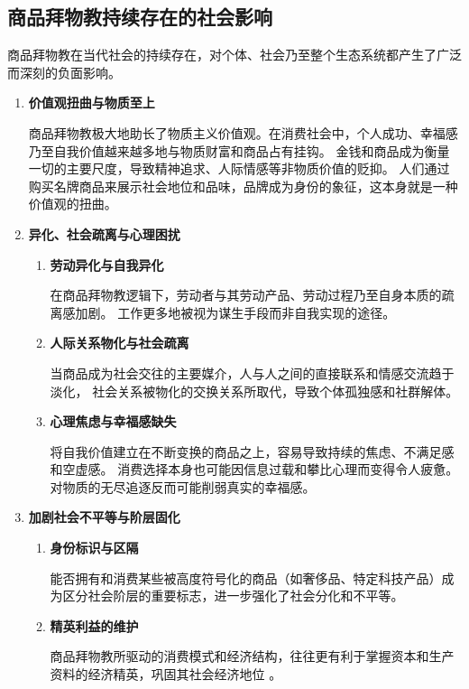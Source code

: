 \subsection{商品拜物教持续存在的社会影响}
商品拜物教在当代社会的持续存在，对个体、社会乃至整个生态系统都产生了广泛而深刻的负面影响。

\begin{enumerate}
    \item \textbf{价值观扭曲与物质至上}

    商品拜物教极大地助长了物质主义价值观。在消费社会中，个人成功、幸福感乃至自我价值越来越多地与物质财富和商品占有挂钩。
    金钱和商品成为衡量一切的主要尺度，导致精神追求、人际情感等非物质价值的贬抑。
    人们通过购买名牌商品来展示社会地位和品味，品牌成为身份的象征，这本身就是一种价值观的扭曲。

    \item \textbf{异化、社会疏离与心理困扰}

        \begin{enumerate}
            \item \textbf{劳动异化与自我异化}

            在商品拜物教逻辑下，劳动者与其劳动产品、劳动过程乃至自身本质的疏离感加剧。
            工作更多地被视为谋生手段而非自我实现的途径。
            \item \textbf{人际关系物化与社会疏离}

            当商品成为社会交往的主要媒介，人与人之间的直接联系和情感交流趋于淡化，
            社会关系被物化的交换关系所取代，导致个体孤独感和社群解体。
            \item \textbf{心理焦虑与幸福感缺失}

            将自我价值建立在不断变换的商品之上，容易导致持续的焦虑、不满足感和空虚感。
            消费选择本身也可能因信息过载和攀比心理而变得令人疲惫。对物质的无尽追逐反而可能削弱真实的幸福感。
        \end{enumerate}

    \item \textbf{加剧社会不平等与阶层固化}
        \begin{enumerate}
            \item \textbf{身份标识与区隔}

            能否拥有和消费某些被高度符号化的商品（如奢侈品、特定科技产品）成为区分社会阶层的重要标志，进一步强化了社会分化和不平等。
            \item \textbf{精英利益的维护}

            商品拜物教所驱动的消费模式和经济结构，往往更有利于掌握资本和生产资料的经济精英，巩固其社会经济地位 。
        \end{enumerate}
\end{enumerate}
